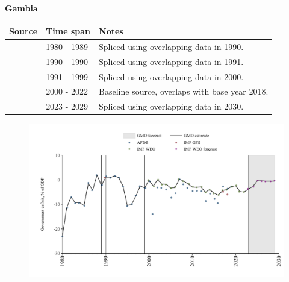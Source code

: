 \documentclass[12pt,a4paper,landscape]{article}
\begin{document}
\begin{adjustbox}{max totalsize={\paperwidth}{\paperheight},center}
\begin{minipage}[t][\textheight][t]{\textwidth}
\vspace*{0.5cm}
{}
\begin{center}
{\Large\bfseries Gambia}
\end{center}
\vspace{0.5cm}
\begin{table}[H]
\centering
\small
\begin{tabular}{|l|l|l|}
\hline
\textbf{Source} & \textbf{Time span} & \textbf{Notes} \\
\hline
\rowcolor{white}\cite{AFDB}& 1980 - 1989 &Spliced using overlapping data in 1990.\\
\rowcolor{lightgray}\cite{IMF_GFS}& 1990 - 1990 &Spliced using overlapping data in 1991.\\
\rowcolor{white}\cite{AFDB}& 1991 - 1999 &Spliced using overlapping data in 2000.\\
\rowcolor{lightgray}\cite{IMF_WEO}& 2000 - 2022 &Baseline source, overlaps with base year 2018.\\
\rowcolor{white}\cite{IMF_WEO_forecast}& 2023 - 2029 &Spliced using overlapping data in 2030.\\
\hline
\end{tabular}
\end{table}
\begin{figure}[H]
\centering
\includegraphics[width=\textwidth,height=0.6\textheight,keepaspectratio]{graphs/GMB_govdef_GDP.pdf}
\end{figure}
\end{minipage}
\end{adjustbox}
\end{document}
